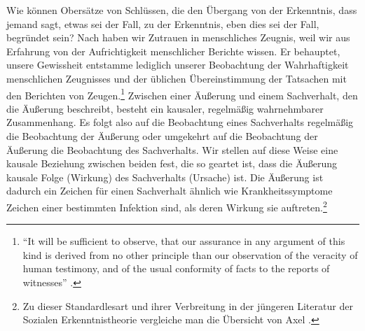 Wie können Obersätze von Schlüssen, die den Übergang von der Erkenntnis, dass
jemand sagt, etwas sei der Fall, zu der Erkenntnis, eben dies sei der Fall,
begründet sein? Nach  haben wir Zutrauen in menschliches
Zeugnis, weil wir aus Erfahrung von der Aufrichtigkeit menschlicher Berichte
wissen. Er behauptet, unsere Gewissheit entstamme lediglich unserer Beobachtung
der Wahrhaftigkeit menschlichen Zeugnisses und der üblichen Übereinstimmung der
Tatsachen mit den Berichten von Zeugen.\footnote{\enquote{It will be sufficient
to observe, that our assurance in any argument of this kind is derived from no
other principle than our observation of the veracity of human testimony, and of
the usual conformity of facts to the reports of witnesses}
\parencite[][90]{Hume:AnEnquiryConcerningHumanUnderstanding1964}.} Zwischen
einer Äußerung und einem Sachverhalt, den die Äußerung beschreibt, besteht ein
kausaler, regelmäßig wahrnehmbarer Zusammenhang. Es folgt also auf die
Beobachtung eines Sachverhalts regelmäßig die Beobachtung der Äußerung oder
umgekehrt auf die Beobachtung der Äußerung die Beobachtung des Sachverhalts. Wir
stellen auf diese Weise eine kausale Beziehung zwischen beiden fest, die so
geartet ist, dass die Äußerung kausale Folge (Wirkung) des Sachverhalts
(Ursache) ist. Die Äußerung ist dadurch ein Zeichen für einen Sachverhalt
ähnlich wie Krankheitssymptome Zeichen einer bestimmten Infektion sind, als
deren Wirkung sie auftreten.\footnote{Zu dieser Standardlesart und ihrer
Verbreitung in der jüngeren Literatur der Sozialen Erkenntnistheorie vergleiche
man die Übersicht von Axel
\textcite[vgl.][61--63]{Gelfert:HumeonTestimonyRevisited2010}.}


